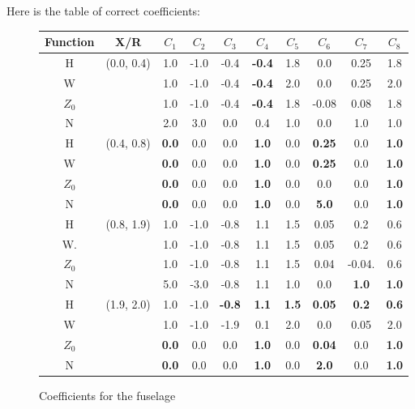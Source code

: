 \documentclass[12pt]{article}
\begin{document}
Here is the table of correct coefficients:
\begin{figure} \begin{centering}
\begin{small}
\begin{tabular}{cccccccccc}
Function & X/R & $C_{1}$ & $C_{2}$ & $C_{3}$ & $C_{4}$ & $C_{5}$ & $C_{6}$ & $C_{7}$ & $C_{8}$ \\
\hline
H          & (0.0, 0.4)  & 1.0 & -1.0 & -0.4 & \textbf{-0.4} & 1.8 & 0.0    & 0.25 & 1.8 \\
W          &                 & 1.0 & -1.0 & -0.4 & \textbf{-0.4} & 2.0 & 0.0    & 0.25 & 2.0 \\
$Z_{0}$ &                 & 1.0 & -1.0 & -0.4 & \textbf{-0.4} & 1.8 & -0.08 & 0.08 & 1.8 \\
N           &                 & 2.0 & 3.0  & 0.0  &              0.4  & 1.0 & 0.0    & 1.0   & 1.0 \\
\hline
H          & (0.4, 0.8)  & \textbf{0.0} & 0.0 & 0.0 & \textbf{1.0} & 0.0 & \textbf{0.25} & 0.0 & \textbf{1.0} \\
W          &                 & \textbf{0.0} & 0.0 & 0.0 & \textbf{1.0} & 0.0 & \textbf{0.25} & 0.0 & \textbf{1.0} \\
$Z_{0}$ &                 & \textbf{0.0} & 0.0 & 0.0 & \textbf{1.0} & 0.0 & 0.0               & 0.0 & \textbf{1.0} \\
N           &                 & \textbf{0.0} & 0.0 & 0.0 & \textbf{1.0} & 0.0 & \textbf{5.0}   & 0.0 & \textbf{1.0} \\
\hline
H          & (0.8, 1.9)  & 1.0 & -1.0 & -0.8 & 1.1 & 1.5 & 0.05 & 0.2             & 0.6 \\
W.         &                 & 1.0 & -1.0 & -0.8 & 1.1 & 1.5 & 0.05 & 0.2             & 0.6 \\
$Z_{0}$ &                 & 1.0 & -1.0 & -0.8 & 1.1 & 1.5 & 0.04 & -0.04.        & 0.6 \\
N           &                 & 5.0 & -3.0 & -0.8 & 1.1 & 1.0 & 0.0   & \textbf{1.0} & \textbf{1.0} \\
\hline
H          & (1.9, 2.0)  & 1.0             & -1.0 & \textbf{-0.8} & \textbf{1.1} & \textbf{1.5} & \textbf{0.05} & \textbf{0.2} & \textbf{0.6} \\
W          &                 & 1.0             & -1.0 &             -1.9 &             0.1 &             2.0 &             0.0   & 0.05           & 2.0 \\
$Z_{0}$ &                 & \textbf{0.0} & 0.0  &             0.0  & \textbf{1.0} &             0.0 & \textbf{0.04} & 0.0             & \textbf{1.0} \\
N           &                 & \textbf{0.0} & 0.0  &             0.0  & \textbf{1.0} &             0.0 & \textbf{2.0}   & 0.0             & \textbf{1.0} \\
\end{tabular}
\caption{Coefficients for the fuselage}
\label{fuscoeff}
\end{small}
\end{centering}\end{figure}%
\end{document}
